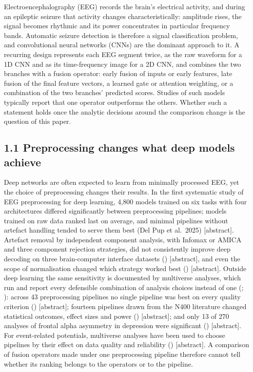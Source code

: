 \documentclass[11pt,a4paper]{article}
\begin{document}
Electroencephalography (EEG) records the brain's electrical activity, and during an
epileptic seizure that activity changes characteristically: amplitude rises, the signal
becomes rhythmic and its power concentrates in particular frequency bands. Automatic
seizure detection is therefore a signal classification problem, and convolutional neural
networks (CNNs) are the dominant approach to it. A recurring design represents each EEG
segment twice, as the raw waveform for a 1D CNN and as its time-frequency image for a 2D
CNN, and combines the two branches with a fusion operator: early fusion of inputs or
early features, late fusion of the final feature vectors, a learned gate or attention
weighting, or a combination of the two branches' predicted scores. Studies of such
models typically report that one operator outperforms the others. Whether such a
statement holds once the analytic decisions around the comparison change is the
question of this paper.

\subsection{1.1 Preprocessing changes what deep models achieve}\label{preprocessing-changes-what-deep-models-achieve}

Deep networks are often expected to learn from minimally processed EEG, yet the choice of
preprocessing changes their results. In the first systematic study of EEG preprocessing
for deep learning, 4,800 models trained on six tasks with four architectures differed
significantly between preprocessing pipelines; models trained on raw data ranked last on
average, and minimal pipelines without artefact handling tended to serve them best (Del
Pup et al.~2025) {[}abstract{]}. Artefact removal by independent component analysis, with
Infomax or AMICA and three component rejection strategies, did not consistently improve
deep decoding on three brain-computer interface datasets (\citealp{Kang_2024}) {[}abstract{]},
and even the scope of normalisation changed which strategy worked best (\citealp{Truong_2025}) {[}abstract{]}. Outside deep learning the same sensitivity is documented by
multiverse analyses, which run and report every defensible combination of analysis
choices instead of one (\citealp{Steegen_2016}; \citealp{Clayson_2024}): across 43 preprocessing
pipelines no single pipeline was best on every quality criterion (\citealp{Huang_2025})
{[}abstract{]}; fourteen pipelines drawn from the N400 literature changed statistical
outcomes, effect sizes and power (\citealp{Soskic_2024}) {[}abstract{]}; and only 13 of 270
analyses of frontal alpha asymmetry in depression were significant (\citealp{Kolodziej_2021}) {[}abstract{]}. For event-related potentials, multiverse analyses have been used to
choose pipelines by their effect on data quality and reliability (\citealp{Clayson_2021})
{[}abstract{]}. A comparison of fusion operators made under one preprocessing pipeline
therefore cannot tell whether its ranking belongs to the operators or to the pipeline.
\end{document}
